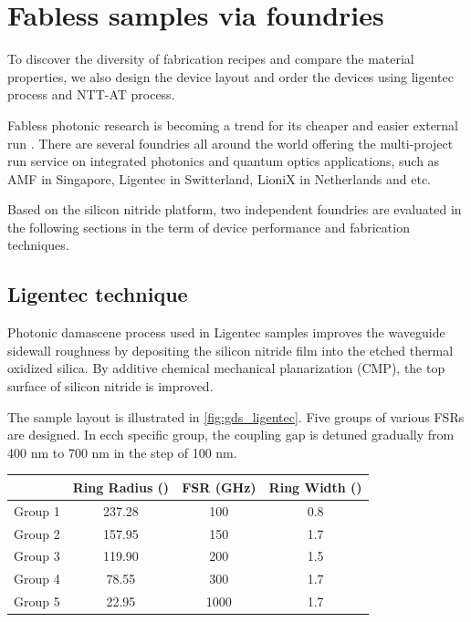 
\chapter{Fabless samples via foundries}

To discover the diversity of fabrication recipes and compare the material properties, we also design the device layout and order the devices using ligentec process and NTT-AT process.

Fabless photonic research is becoming a trend for its cheaper and easier external run \cite{Hochberg2010}. There are several foundries all around the world offering the multi-project run service on integrated photonics and quantum optics applications, such as AMF in Singapore, Ligentec in Switterland, LioniX in Netherlands and etc. 

Based on the silicon nitride platform, two independent foundries are evaluated in the following sections in the term of device performance and fabrication techniques.

\section{Ligentec technique}
Photonic damascene process \cite{Pfeiffer2015a,Pfeiffer2018a} used in Ligentec samples improves the waveguide sidewall roughness by depositing the silicon nitride film into the etched thermal oxidized silica. By additive chemical mechanical planarization (CMP), the top surface of silicon nitride is improved.

The sample layout is illustrated in \autoref{fig:gds_ligentec}. Five groups of various FSRs are designed. In ecch specific group, the coupling gap is detuned gradually from 400 nm to 700 nm in the step of 100 nm.


\begin{table}[]
	\begin{tabular}{cccc}
		& Ring Radius (\um) & FSR (GHz) & Ring Width (\um) \\ \hline
		Group 1 & 237.28                                                 & 100       & 0.8                                                   \\ \hline
		Group 2 & 157.95                                                 & 150       & 1.7                                                   \\ \hline
		Group 3 & 119.90                                                 & 200       & 1.5                                                   \\ \hline
		Group 4 & 78.55                                                  & 300       & 1.7                                                   \\ \hline
		Group 5 & 22.95                                                  & 1000      & 1.7                                                   \\ \hline
	\end{tabular}
\end{table}

